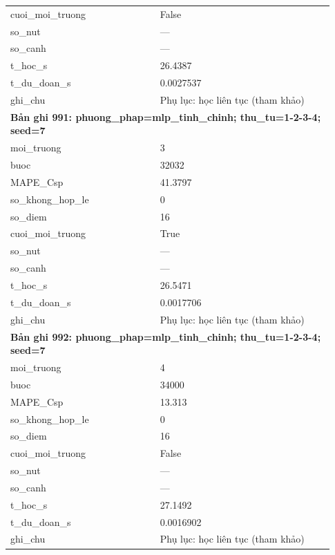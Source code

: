 \begin{longtable}{p{0.43\linewidth}p{0.50\linewidth}}
cuoi\_\allowbreak moi\_\allowbreak truong & False \\
so\_\allowbreak nut & — \\
so\_\allowbreak canh & — \\
t\_\allowbreak hoc\_\allowbreak s & 26.4387 \\
t\_\allowbreak du\_\allowbreak doan\_\allowbreak s & 0.0027537 \\
ghi\_\allowbreak chu & Phụ lục: học liên tục (tham khảo) \\
\midrule
\multicolumn{2}{p{0.95\linewidth}}{\textbf{Bản ghi 991: phuong\_phap=mlp\_tinh\_chinh; thu\_tu=1-2-3-4; seed=7}} \\
moi\_\allowbreak truong & 3 \\
buoc & 32032 \\
MAPE\_\allowbreak Csp & 41.3797 \\
so\_\allowbreak khong\_\allowbreak hop\_\allowbreak le & 0 \\
so\_\allowbreak diem & 16 \\
cuoi\_\allowbreak moi\_\allowbreak truong & True \\
so\_\allowbreak nut & — \\
so\_\allowbreak canh & — \\
t\_\allowbreak hoc\_\allowbreak s & 26.5471 \\
t\_\allowbreak du\_\allowbreak doan\_\allowbreak s & 0.0017706 \\
ghi\_\allowbreak chu & Phụ lục: học liên tục (tham khảo) \\
\midrule
\multicolumn{2}{p{0.95\linewidth}}{\textbf{Bản ghi 992: phuong\_phap=mlp\_tinh\_chinh; thu\_tu=1-2-3-4; seed=7}} \\
moi\_\allowbreak truong & 4 \\
buoc & 34000 \\
MAPE\_\allowbreak Csp & 13.313 \\
so\_\allowbreak khong\_\allowbreak hop\_\allowbreak le & 0 \\
so\_\allowbreak diem & 16 \\
cuoi\_\allowbreak moi\_\allowbreak truong & False \\
so\_\allowbreak nut & — \\
so\_\allowbreak canh & — \\
t\_\allowbreak hoc\_\allowbreak s & 27.1492 \\
t\_\allowbreak du\_\allowbreak doan\_\allowbreak s & 0.0016902 \\
ghi\_\allowbreak chu & Phụ lục: học liên tục (tham khảo) \\

\end{longtable}
